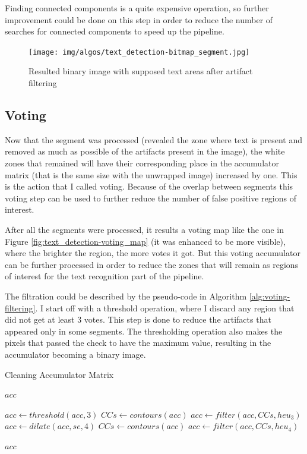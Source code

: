 Finding connected components is a quite expensive operation, so further improvement could be done on this step in order to reduce the number of searches for connected components to speed up the pipeline.

\begin{figure}
    \centering
    \texttt{[image: img/algos/text\_detection-bitmap\_segment.jpg]}
    \caption{Resulted binary image with supposed text areas after artifact filtering}
    \label{fig:text_detection-bitmap_segment}
\end{figure}

\subsection{Voting}

Now that the segment was processed (revealed the zone where text is present and removed as much as possible of the artifacts present in the image), the white zones that remained will have their corresponding place in the accumulator matrix (that is the same size with the unwrapped image) increased by one. This is the action that I called voting. Because of the overlap between segments this voting step can be used to further reduce the number of false positive regions of interest.

After all the segments were processed, it results a voting map like the one in Figure \ref{fig:text_detection-voting_map} (it was enhanced to be more visible), where the brighter the region, the more votes it got. But this voting accumulator can be further processed in order to reduce the zones that will remain as regions of interest for the text recognition part of the pipeline.

The filtration could be described by the pseudo-code in Algorithm \ref{alg:voting-filtering}. I start off with a threshold operation, where I discard any region that did not get at least 3 votes. This step is done to reduce the artifacts that appeared only in some segments. The thresholding operation also makes the pixels that passed the check to have the maximum value, resulting in the accumulator becoming a binary image.

\begin{algorithm}
    \caption{Cleaning Accumulator Matrix}\label{alg:voting-filtering}
    \begin{algorithmic}[1]
        \Require $acc$

        \State $acc \gets threshold(acc, 3)$
        \State $CCs \gets contours(acc)$\label{alg:voting-filtering:contours-1}
        \State $acc \gets filter(acc, CCs, heu_3)$\label{alg:voting-filtering:filter-1}
        \State $acc \gets dilate(acc, se, 4)$
        \State $CCs \gets contours(acc)$
        \State $acc \gets filter(acc, CCs, heu_4)$

        \State \Return $acc$
    \end{algorithmic}
\end{algorithm}

